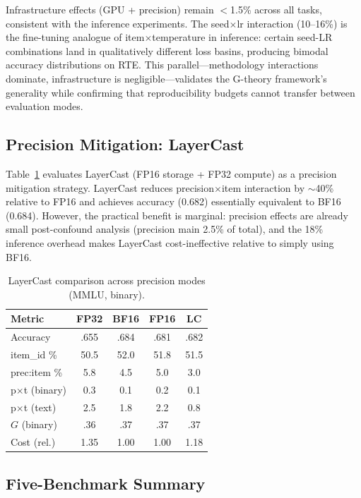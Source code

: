 \documentclass[11pt,twocolumn]{article}
\begin{document}
Infrastructure effects (GPU + precision) remain $<$1.5\% across all tasks, consistent with the inference experiments. The seed$\times$lr interaction (10--16\%) is the fine-tuning analogue of item$\times$temperature in inference: certain seed-LR combinations land in qualitatively different loss basins, producing bimodal accuracy distributions on RTE. This parallel---methodology interactions dominate, infrastructure is negligible---validates the G-theory framework's generality while confirming that reproducibility budgets cannot transfer between evaluation modes.

\subsection{Precision Mitigation: LayerCast}
\label{sec:layercast}

Table~\ref{tab:layercast} evaluates LayerCast (FP16 storage + FP32 compute) as a precision mitigation strategy. LayerCast reduces precision$\times$item interaction by $\sim$40\% relative to FP16 and achieves accuracy (0.682) essentially equivalent to BF16 (0.684). However, the practical benefit is marginal: precision effects are already small post-confound analysis (precision main 2.5\% of total), and the 18\% inference overhead makes LayerCast cost-ineffective relative to simply using BF16.

\begin{table}[t]
\centering
\caption{LayerCast comparison across precision modes (MMLU, binary).}
\label{tab:layercast}
\small
\begin{tabular}{@{}lcccc@{}}
\toprule
Metric & FP32 & BF16 & FP16 & LC \\
\midrule
Accuracy & .655 & .684 & .681 & .682 \\
item\_id \% & 50.5 & 52.0 & 51.8 & 51.5 \\
prec:item \% & 5.8 & 4.5 & 5.0 & 3.0 \\
p$\times$t (binary) & 0.3 & 0.1 & 0.2 & 0.1 \\
p$\times$t (text) & 2.5 & 1.8 & 2.2 & 0.8 \\
$G$ (binary) & .36 & .37 & .37 & .37 \\
Cost (rel.) & 1.35 & 1.00 & 1.00 & 1.18 \\
\bottomrule
\end{tabular}
\end{table}

\subsection{Five-Benchmark Summary}
\end{document}
